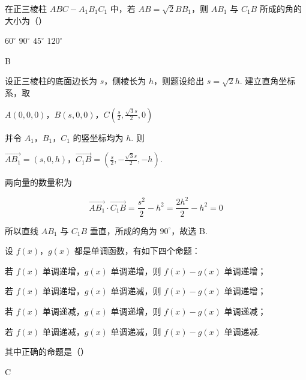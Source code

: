 \begin{problem}
在正三棱柱 \(ABC - A_{1}B_{1}C_{1}\) 中，若 \(AB = \sqrt{2}BB_{1}\)，则 \(AB_{1}\) 与 \(C_{1}B\) 所成的角的大小为（\quad）

\choices
    {\(60^{\circ}\)}
    {\(90^{\circ}\)}
    {\(45^{\circ}\)}
    {\(120^{\circ}\)}
\end{problem}

\begin{answer}
B
\end{answer}

\begin{solution}
设正三棱柱的底面边长为 \(s\)，侧棱长为 \(h\)，则题设给出 \(s=\sqrt{2}h\). 建立直角坐标系，取

\(A(0,0,0)\)，\(B(s,0,0)\)，\(C\left(\frac{s}{2},\frac{\sqrt{3}s}{2},0\right)\)

并令 \(A_1\)，\(B_1\)，\(C_1\) 的竖坐标均为 \(h\). 则

\(\overrightarrow{AB_1}=(s,0,h)\)，\(\overrightarrow{C_1B}=\left(\frac{s}{2},-\frac{\sqrt{3}s}{2},-h\right)\).

两向量的数量积为

\[
\overrightarrow{AB_1}\cdot\overrightarrow{C_1B}
=\frac{s^2}{2}-h^2=\frac{2h^2}{2}-h^2=0
\]

所以直线 \(AB_1\) 与 \(C_1B\) 垂直，所成的角为 \(90^{\circ}\)，故选 B.
\end{solution}

\begin{problem}
设 \(f(x)\)，\(g(x)\) 都是单调函数，有如下四个命题：

\begin{circlelist}
\item 若 \(f(x)\) 单调递增，\(g(x)\) 单调递增，则 \(f(x) - g(x)\) 单调递增；
\item 若 \(f(x)\) 单调递增，\(g(x)\) 单调递减，则 \(f(x) - g(x)\) 单调递增；
\item 若 \(f(x)\) 单调递减，\(g(x)\) 单调递增，则 \(f(x) - g(x)\) 单调递减；
\item 若 \(f(x)\) 单调递减，\(g(x)\) 单调递减，则 \(f(x) - g(x)\) 单调递减.
\end{circlelist}

其中正确的命题是（\quad）

\choices
    {}
    {}
    {}
    {}
\end{problem}

\begin{answer}
C
\end{answer}

